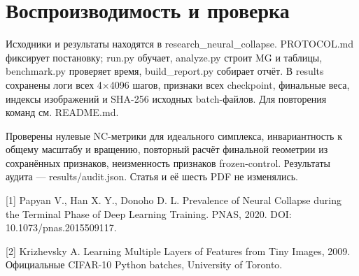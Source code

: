 \documentclass[10pt,a4paper]{article}
\begin{document}
\section*{Воспроизводимость и проверка}

Исходники и результаты находятся в research\_neural\_collapse. PROTOCOL.md фиксирует постановку; run.py обучает, analyze.py строит MG и таблицы, benchmark.py проверяет время, build\_report.py собирает отчёт. В results сохранены логи всех 4\ensuremath{\times}4096 шагов, признаки всех checkpoint, финальные веса, индексы изображений и SHA-256 исходных batch-файлов. Для повторения команд см. README.md.

Проверены нулевые NC-метрики для идеального симплекса, инвариантность к общему масштабу и вращению, повторный расчёт финальной геометрии из сохранённых признаков, неизменность признаков frozen-control. Результаты аудита --- results/audit.json. Статья и её шесть PDF не изменялись.

[1] Papyan V., Han X. Y., Donoho D. L. Prevalence of Neural Collapse during the Terminal Phase of Deep Learning Training. PNAS, 2020. DOI: 10.1073/pnas.2015509117.

[2] Krizhevsky A. Learning Multiple Layers of Features from Tiny Images, 2009. Официальные CIFAR-10 Python batches, University of Toronto.
\end{document}
